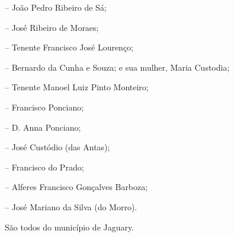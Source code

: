 -- João Pedro Ribeiro de Sá;

-- José Ribeiro de Moraes;

-- Tenente Francisco José Lourenço;

-- Bernardo da Cunha e Souza; e sua mulher, Maria Custodia;

-- Tenente Manoel Luiz Pinto Monteiro;

-- Francisco Ponciano;

-- D. Anna Ponciano;

-- José Custódio (das Antas);

-- Francisco do Prado;

-- Alferes Francisco Gonçalves Barboza;

-- José Mariano da Silva (do Morro).

São todos do município de Jaguary.

